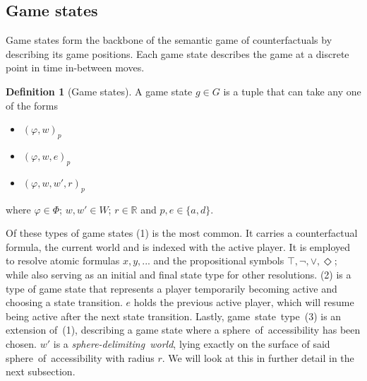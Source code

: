\documentclass[a4paper,american]{paper}
\theoremstyle{definition}\newtheorem{definition}{Definition}
\begin{document}
\subsection{Game states}
Game states form the backbone of the semantic game of counterfactuals by describing its game positions. Each game state describes the game at a discrete point in time in-between moves.
\begin{definition}[Game states]
A game state $g\in G$ is a tuple that can take any one of the forms
\begin{itemize}
	\item[(1)] $(\varphi ,w)_p$
	\item[(2)] $(\varphi ,w, e)_p$
	\item[(3)] $(\varphi ,w,w',r)_p$
\end{itemize}
where $\varphi\in\Phi$; $w,w'\in W$; $r\in\mathbb{R}$ and $p,e\in\{ a,d\}$.
\end{definition}
\noindent Of these types of game states (1) is the most common. It carries a counterfactual formula, the current world and is indexed with the active player. It is employed to resolve atomic formulas $x,y,...$ and the propositional symbols $\top,\neg,\vee,\Diamond$; while also serving as an initial and final state type for other resolutions. (2) is a type of game state that represents a player temporarily becoming active and choosing a state transition. $e$ holds the previous active player, which will resume being active after the next state transition. Lastly, game~state~type~(3) is an extension of~(1), describing a game state where a sphere~of~accessibility has been chosen. $w'$ is a \textit{sphere-delimiting~world}, lying exactly on the surface of said sphere~of~accessibility with radius $r$. We will look at this in further detail in the next subsection.\\
\end{document}
